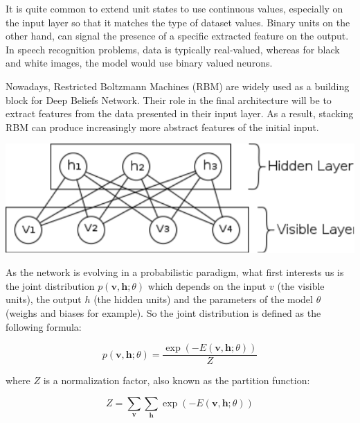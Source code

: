 \documentclass{report}
\begin{document}
	It is quite common to extend unit states to use continuous values, especially 
	on the input layer so that it matches the type of dataset values. Binary units 
	on the other hand, can signal the presence of a specific extracted feature on 
	the output. In speech recognition problems, data is typically real-valued, 
	whereas for black and white images, the model would use binary valued neurons.
	
	Nowadays, Restricted Boltzmann Machines (RBM) are widely used as a 
	building block for Deep Beliefs Network. Their role in the final architecture 
	will be to extract features from the data presented in their input layer. 
	As a result, stacking RBM can produce increasingly more abstract features of
	the initial input. 
	
	\vspace{0.5cm}
	\begin{center}
		\includegraphics[scale=0.5]{ressources/rbm}
		\vspace{0.3cm}
	\end{center}
	\vspace{0.5cm}
	
	As the network is evolving in a probabilistic paradigm, what first interests us 
	is the joint distribution $p(\textbf{v}, \textbf{h}; \theta )$ which depends on the 
	input $v$ (the visible units), the output $h$ (the hidden units) and the parameters 
	of the model $\theta$ (weighs and biases for example). So the joint distribution 
	is defined as the following formula:
	
	\vspace{0.5cm}
	\begin{equation} p (\textbf{v}, \textbf{h}; \theta )
	= \frac{\exp (-E (\textbf{v}, \textbf{h}; \theta))}{Z}
	\end{equation}
	\vspace{0.5cm}
	
	where $Z$ is a normalization factor, also known as the partition function:
	
	\vspace{0.5cm}
	\begin{equation}
	Z = \sum_{\textbf{v}}\sum_{\textbf{h}}\exp (-E(\textbf{v}, \textbf{h}; \theta))
	\end{equation}
	\vspace{0.5cm}	
		
\end{document}
